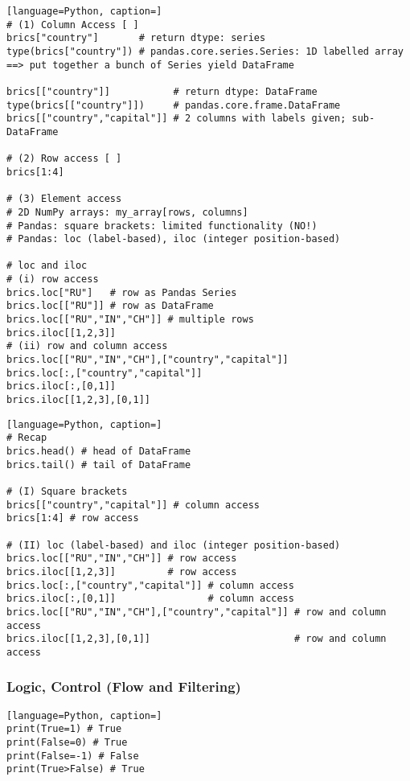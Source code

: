 \documentclass[12pt]{article}
\begin{document}
\begin{lstlisting}[language=Python, caption=]
# (1) Column Access [ ]
brics["country"]       # return dtype: series
type(brics["country"]) # pandas.core.series.Series: 1D labelled array ==> put together a bunch of Series yield DataFrame

brics[["country"]]           # return dtype: DataFrame
type(brics[["country"]])     # pandas.core.frame.DataFrame
brics[["country","capital"]] # 2 columns with labels given; sub-DataFrame

# (2) Row access [ ]
brics[1:4]

# (3) Element access
# 2D NumPy arrays: my_array[rows, columns]
# Pandas: square brackets: limited functionality (NO!)
# Pandas: loc (label-based), iloc (integer position-based)

# loc and iloc
# (i) row access
brics.loc["RU"]   # row as Pandas Series
brics.loc[["RU"]] # row as DataFrame
brics.loc[["RU","IN","CH"]] # multiple rows
brics.iloc[[1,2,3]]
# (ii) row and column access
brics.loc[["RU","IN","CH"],["country","capital"]]
brics.loc[:,["country","capital"]]
brics.iloc[:,[0,1]]
brics.iloc[[1,2,3],[0,1]]
\end{lstlisting}

\begin{lstlisting}[language=Python, caption=]
# Recap
brics.head() # head of DataFrame
brics.tail() # tail of DataFrame

# (I) Square brackets
brics[["country","capital"]] # column access
brics[1:4] # row access

# (II) loc (label-based) and iloc (integer position-based)
brics.loc[["RU","IN","CH"]] # row access
brics.iloc[[1,2,3]]         # row access
brics.loc[:,["country","capital"]] # column access
brics.iloc[:,[0,1]]                # column access
brics.loc[["RU","IN","CH"],["country","capital"]] # row and column access
brics.iloc[[1,2,3],[0,1]]                         # row and column access
\end{lstlisting}

\subsubsection{\normalsize Logic, Control (Flow and Filtering)}
\begin{lstlisting}[language=Python, caption=]
print(True=1) # True
print(False=0) # True
print(False=-1) # False
print(True>False) # True
\end{lstlisting}
\end{document}

